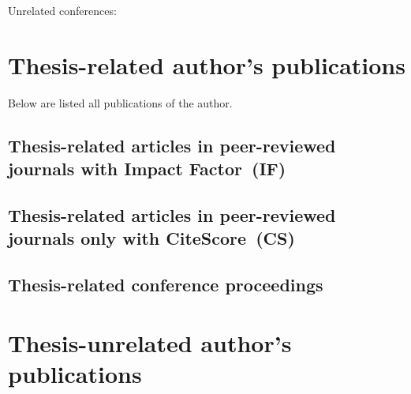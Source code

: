 \documentclass[a4paper,11pt,titlepage,twoside]{article}
\newcommand{\conditionalClearPage}{
  \ifdefined\printversion
  \clearemptydoublepage
  \else
  \newpage{}
  \clearpage
\fi
}
\begin{document}
Unrelated conferences:
\cite{daniel2016terrestrial}
\cite{daniel2017xray}



\conditionalClearPage
\printbibliography[notkeyword=mine]
\conditionalClearPage



\appendix

\section{Thesis-related author's publications}

Below are listed all publications of the author.

\subsection*{Thesis-related articles in peer-reviewed journals with Impact Factor~(IF)}
\nocite{}
\printbibliography[keyword={mine},keyword={phd_related},keyword={journal},keyword={if},heading=none,title={}]

\subsection*{Thesis-related articles in peer-reviewed journals only with CiteScore~(CS)}
\nocite{}
\printbibliography[keyword={mine},keyword={phd_related},keyword={journal},keyword={cs},heading=none,title={}]

\subsection*{Thesis-related conference proceedings}
\nocite{}
\printbibliography[keyword={mine},keyword={phd_related},keyword={conference},heading=none,title={}]

\section{Thesis-unrelated author's publications}
\end{document}
